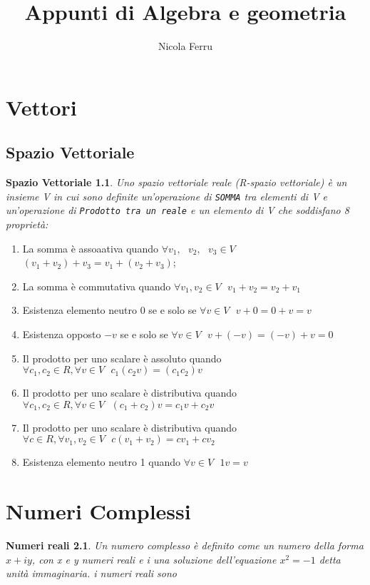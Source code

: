 \documentclass{book}
\title{Appunti di Algebra e geometria}
\author{Nicola Ferru}
\date{}
\begin{document}
\maketitle
\tableofcontents
\listoftables
\listoffigures


\chapter{Vettori}
\section{Spazio Vettoriale}
\newtheorem{SpaVet}{Spazio Vettoriale}
\begin{SpaVet}
	Uno spazio vettoriale reale (R-spazio vettoriale) è un insieme \textit{V} in
	cui sono definite un'operazione di \texttt{SOMMA} tra elementi di
	\textit{V} e un'operazione di \texttt{Prodotto tra un reale} e un elemento
	di V che soddisfano 8 proprietà:
\end{SpaVet}
\begin{enumerate}
	\item La somma è assoaativa quando $\forall v_1, \text{ } v_2, \text{ } v_3 
		\in V$ $\left(v_1+v_2\right)+v_3=v_1+\left(v_2+v_3\right)$;
	\item La somma è commutativa quando $\forall v_1, v_2 \in V\text{ }
		v_1+v_2=v_2+v_1$
	\item Esistenza elemento neutro 0 se e solo se $\forall v\in V \text{ }
		v+0=0+v=v$
	\item Esistenza opposto $-v$ se e solo se $\forall v \in V \text{ }
		v+(-v)=(-v)+v=0$
	\item Il prodotto per uno scalare è assoluto quando $\forall c_1,c_2 \in
		R, \forall v\in V \text{ } c_1(c_2v)=(c_1c_2)v$
	\item Il prodotto per uno scalare è distributiva quando $\forall c_1,c_2 \in
		R, \forall v\in V \text{ } (c_1+c_2)v=c_1v+c_2v$
	\item Il prodotto per uno scalare è distributiva quando $\forall c \in
		R, \forall v_1, v_2\in V \text{ }c(v_1+v_2)=cv_1+cv_2$
	\item Esistenza elemento neutro 1 quando $\forall v\in V \text{ } 1v=v$
\end{enumerate}

\chapter {Numeri Complessi}
\newtheorem{NumComp}{Numeri reali}
\begin{NumComp}
	Un numero complesso è definito come un numero della forma $x+iy$, con x e y numeri reali e i una
	soluzione dell'equazione $x^2=-1$ detta unità immaginaria. i numeri reali
	sono
\end{NumComp}
\end{document}
